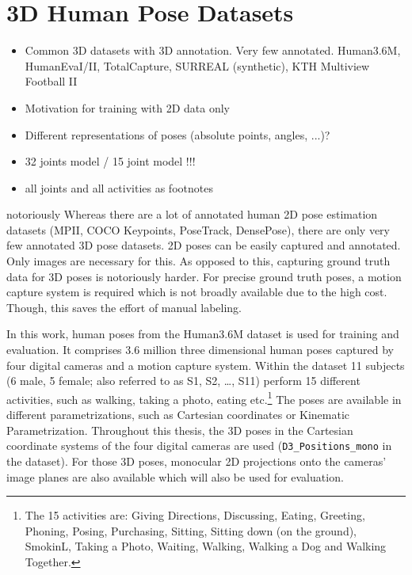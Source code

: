 \section{3D Human Pose Datasets}
\label{sec:data}

\begin{itemize}
	\item Common 3D datasets with 3D annotation. Very few annotated. Human3.6M, HumanEvaI/II, TotalCapture, SURREAL (synthetic), KTH Multiview Football II
	\item Motivation for training with 2D data only
	\item Different representations of poses (absolute points, angles, ...)?
	\item 32 joints model / 15 joint model !!!
	\item all joints and all activities as footnotes
\end{itemize}
 
notoriously
Whereas there are a lot of annotated human 2D pose estimation datasets (MPII, COCO Keypoints, PoseTrack, DensePose), there are only very few annotated 3D pose datasets. 
2D poses can be easily captured and annotated.
Only images are necessary for this.
As opposed to this, capturing ground truth data for 3D poses is notoriously harder.
For precise ground truth poses, a motion capture system is required which is not broadly available due to the high cost.
Though, this saves the effort of manual labeling.



In this work, human poses from the Human3.6M dataset \cite{ionescu14} is used for training and evaluation.
It comprises 3.6 million three dimensional human poses captured by four digital cameras and a motion capture system.
Within the dataset 11 subjects (6 male, 5 female; also referred to as S1, S2, \dots, S11) perform 15 different activities, such as walking, taking a photo, eating etc.\footnote{
	The 15 activities are: Giving Directions, Discussing, Eating, Greeting, Phoning, Posing, Purchasing, Sitting, Sitting down (on the ground), SmokinL, Taking a Photo, Waiting, Walking, Walking a Dog and Walking Together.
}
The poses are available in different parametrizations, such as Cartesian coordinates or Kinematic Parametrization.
Throughout this thesis, the 3D poses in the Cartesian coordinate systems of the four digital cameras are used (\texttt{D3\_Positions\_mono} in the dataset).
For those 3D poses, monocular 2D projections onto the cameras' image planes are also available which will also be used for evaluation.

